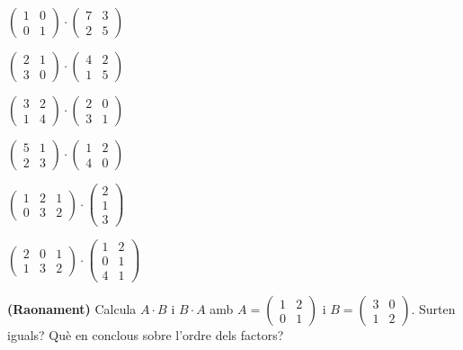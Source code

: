 \begin{exercicis}
\begin{exlist}
  \item $\begin{pmatrix} 1 & 0 \\ 0 & 1 \end{pmatrix}\cdot\begin{pmatrix} 7 & 3 \\ 2 & 5 \end{pmatrix}$
  \item $\begin{pmatrix} 2 & 1 \\ 3 & 0 \end{pmatrix}\cdot\begin{pmatrix} 4 & 2 \\ 1 & 5 \end{pmatrix}$
  \item $\begin{pmatrix} 3 & 2 \\ 1 & 4 \end{pmatrix}\cdot\begin{pmatrix} 2 & 0 \\ 3 & 1 \end{pmatrix}$
  \item $\begin{pmatrix} 5 & 1 \\ 2 & 3 \end{pmatrix}\cdot\begin{pmatrix} 1 & 2 \\ 4 & 0 \end{pmatrix}$
  \item $\begin{pmatrix} 1 & 2 & 1 \\ 0 & 3 & 2 \end{pmatrix}\cdot\begin{pmatrix} 2 \\ 1 \\ 3 \end{pmatrix}$
  \item $\begin{pmatrix} 2 & 0 & 1 \\ 1 & 3 & 2 \end{pmatrix}\cdot\begin{pmatrix} 1 & 2 \\ 0 & 1 \\ 4 & 1 \end{pmatrix}$
  \item \textbf{(Raonament)} Calcula $A\cdot B$ i $B\cdot A$ amb
        $A=\begin{pmatrix} 1 & 2 \\ 0 & 1 \end{pmatrix}$ i
        $B=\begin{pmatrix} 3 & 0 \\ 1 & 2 \end{pmatrix}$. Surten iguals? Què en
        conclous sobre l'ordre dels factors?
\end{exlist}
\end{exercicis}

